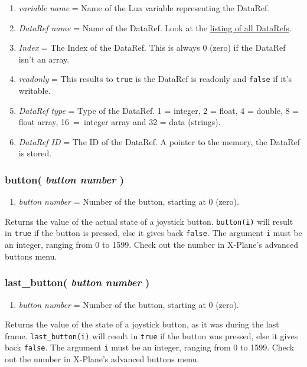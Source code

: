 \documentclass[11pt,parskip=half,a4paper]{scrartcl}
\begin{document}
\begin{enumerate}
	\item \emph{variable name} = Name of the Lua variable representing the DataRef.
	\item \emph{DataRef name} = Name of the DataRef. Look at the \href{http://www.xsquawkbox.net/xpsdk/docs/DataRefs.html}{listing of all DataRefs}.
	\item \emph{Index} = The Index of the DataRef. This is always 0 (zero) if the DataRef isn't an array.
	\item \emph{readonly} = This results to \verb|true| is the DataRef is readonly and \verb|false| if it's writable.
	\item \emph{DataRef type} = Type of the DataRef. 1 = integer, 2 = float, 4 = double, 8 = float array, 16~=~integer array and 32 = data (strings).
	\item \emph{DataRef ID} = The ID of the DataRef. A pointer to the memory, the DataRef is stored.
\end{enumerate}


\subsubsection{button( \emph{button number} )}

\begin{enumerate}
	\item \emph{button number} = Number of the button, starting at 0 (zero).
\end{enumerate}

Returns the value of the actual state of a joystick button. \verb|button(i)| will result in \verb|true| if the button is pressed, else it gives back \verb|false|. The argument \verb|i| must be an integer, ranging from 0 to 1599. Check out the number in X-Plane's advanced buttons menu.

\subsubsection{last\_button( \emph{button number} )}

\begin{enumerate}
	\item \emph{button number} = Number of the button, starting at 0 (zero).
\end{enumerate}

Returns the value of the state of a joystick button, as it was during the last frame. \verb|last_button(i)| will result in \verb|true| if the button was pressed, else it gives back \verb|false|. The argument \verb|i| must be an integer, ranging from 0 to 1599. Check out the number in X-Plane's advanced buttons menu.
\end{document}
